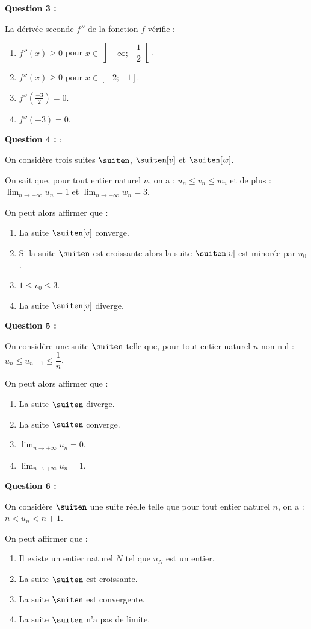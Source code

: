 \textbf{Question 3 :}

\smallskip

La dérivée seconde $f''$ de la fonction $f$ vérifie :
%
\begin{enumerate}[label=(\alph*)]
	\item $f''(x) \geqslant 0$ pour $x \in \left] -\infty ; -\dfrac12 \right[$.
	\item $f''(x) \geqslant 0$ pour $x \in [-2;-1]$.
	\item $f''\left(\frac{-3}{2}\right)=0$.
	\item $f''(-3)=0$.
\end{enumerate}

\textbf{Question 4 :} :

\smallskip

On considère trois suites $\suiten$, $\suiten[v]$ et $\suiten[w]$.

On sait que, pour tout entier naturel $n$, on a : $u_n \leqslant v_n \leqslant w_n$ et de plus : $\lim_{n \to +\infty} u_n=1$ et $\lim_{n \to +\infty} w_n=3$.

On peut alors affirmer que :
%
\begin{enumerate}[label=(\alph*)]
	\item La suite $\suiten[v]$ converge.
	\item Si la suite $\suiten$ est croissante alors la suite $\suiten[v]$ est minorée par $u_0$.
	\item $1 \leqslant v_0 \leqslant 3$.
	\item La suite $\suiten[v]$ diverge.
\end{enumerate}

\textbf{Question 5 :}

\smallskip

On considère une suite $\suiten$ telle que, pour tout entier naturel $n$ non nul : $u_n \leqslant u_{n+1} \leqslant \dfrac{1}{n}$.

On peut alors affirmer que :
%
\begin{enumerate}[label=(\alph*)]
	\item La suite $\suiten$ diverge.
	\item La suite $\suiten$ converge.
	\item $\lim_{n \to +\infty} u_n=0$.
	\item $\lim_{n \to +\infty} u_n=1$.
\end{enumerate}

\textbf{Question 6 :}

\smallskip

On considère $\suiten$ une suite réelle telle que pour tout entier naturel $n$, on a : $n < u_n < n + 1$.

On peut affirmer que :
%
\begin{enumerate}[label=(\alph*)]
	\item Il existe un entier naturel $N$ tel que $u_N$ est un entier.
	\item La suite $\suiten$ est croissante.
	\item La suite $\suiten$ est convergente.
	\item La suite $\suiten$ n'a pas de limite.
\end{enumerate}

